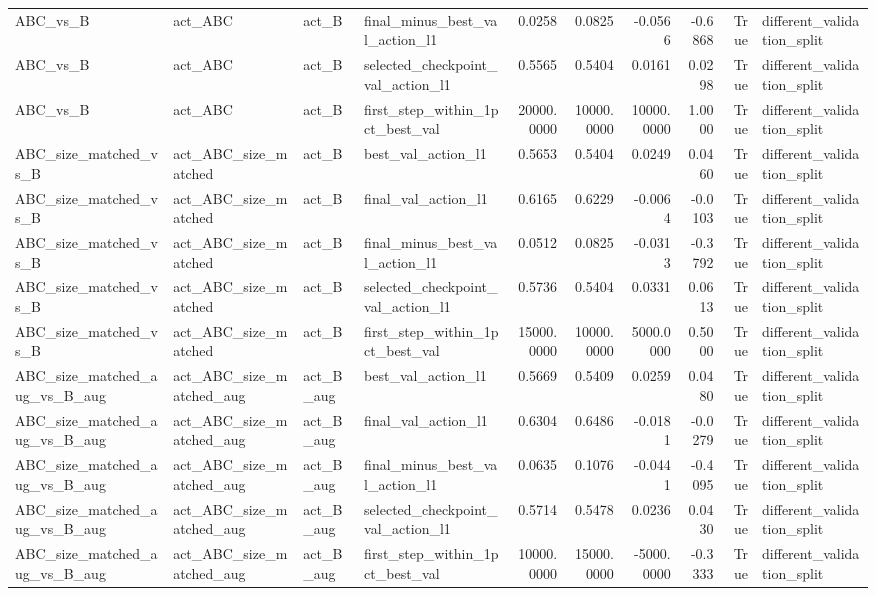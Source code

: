 \begin{tabular}{llllrrrrrl}
ABC\_vs\_B & act\_ABC & act\_B & final\_minus\_best\_val\_action\_l1 & 0.0258 & 0.0825 & -0.0566 & -0.6868 & True & different\_validation\_split \\
ABC\_vs\_B & act\_ABC & act\_B & selected\_checkpoint\_val\_action\_l1 & 0.5565 & 0.5404 & 0.0161 & 0.0298 & True & different\_validation\_split \\
ABC\_vs\_B & act\_ABC & act\_B & first\_step\_within\_1pct\_best\_val & 20000.0000 & 10000.0000 & 10000.0000 & 1.0000 & True & different\_validation\_split \\
ABC\_size\_matched\_vs\_B & act\_ABC\_size\_matched & act\_B & best\_val\_action\_l1 & 0.5653 & 0.5404 & 0.0249 & 0.0460 & True & different\_validation\_split \\
ABC\_size\_matched\_vs\_B & act\_ABC\_size\_matched & act\_B & final\_val\_action\_l1 & 0.6165 & 0.6229 & -0.0064 & -0.0103 & True & different\_validation\_split \\
ABC\_size\_matched\_vs\_B & act\_ABC\_size\_matched & act\_B & final\_minus\_best\_val\_action\_l1 & 0.0512 & 0.0825 & -0.0313 & -0.3792 & True & different\_validation\_split \\
ABC\_size\_matched\_vs\_B & act\_ABC\_size\_matched & act\_B & selected\_checkpoint\_val\_action\_l1 & 0.5736 & 0.5404 & 0.0331 & 0.0613 & True & different\_validation\_split \\
ABC\_size\_matched\_vs\_B & act\_ABC\_size\_matched & act\_B & first\_step\_within\_1pct\_best\_val & 15000.0000 & 10000.0000 & 5000.0000 & 0.5000 & True & different\_validation\_split \\
ABC\_size\_matched\_aug\_vs\_B\_aug & act\_ABC\_size\_matched\_aug & act\_B\_aug & best\_val\_action\_l1 & 0.5669 & 0.5409 & 0.0259 & 0.0480 & True & different\_validation\_split \\
ABC\_size\_matched\_aug\_vs\_B\_aug & act\_ABC\_size\_matched\_aug & act\_B\_aug & final\_val\_action\_l1 & 0.6304 & 0.6486 & -0.0181 & -0.0279 & True & different\_validation\_split \\
ABC\_size\_matched\_aug\_vs\_B\_aug & act\_ABC\_size\_matched\_aug & act\_B\_aug & final\_minus\_best\_val\_action\_l1 & 0.0635 & 0.1076 & -0.0441 & -0.4095 & True & different\_validation\_split \\
ABC\_size\_matched\_aug\_vs\_B\_aug & act\_ABC\_size\_matched\_aug & act\_B\_aug & selected\_checkpoint\_val\_action\_l1 & 0.5714 & 0.5478 & 0.0236 & 0.0430 & True & different\_validation\_split \\
ABC\_size\_matched\_aug\_vs\_B\_aug & act\_ABC\_size\_matched\_aug & act\_B\_aug & first\_step\_within\_1pct\_best\_val & 10000.0000 & 15000.0000 & -5000.0000 & -0.3333 & True & different\_validation\_split \\
\bottomrule
\end{tabular}

